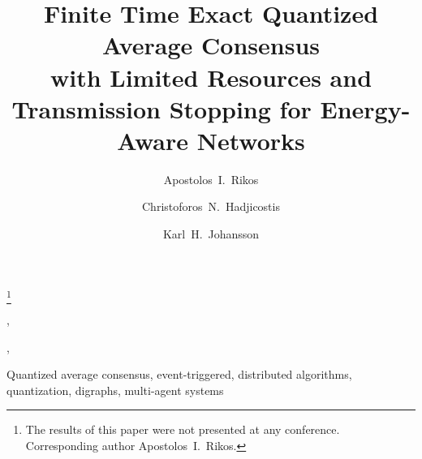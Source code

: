 \documentclass[twocolumn]{autart}    %
\begin{document}
\begin{frontmatter}

\title{Finite Time Exact Quantized Average Consensus \\ with Limited Resources and Transmission Stopping for Energy-Aware Networks} %
 
\thanks[footnoteinfo]{The results of this paper were not presented at any conference.
Corresponding author Apostolos~I.~Rikos.}

\author[First]{Apostolos~I.~Rikos}, 
\author[Second]{Christoforos~N.~Hadjicostis}, 
\author[First]{Karl~H.~Johansson} 

\address[First]{Division of Decision and Control Systems, KTH Royal Institute of Technology, \\ and also affiliated with Digital Futures, SE-100 44 Stockholm, Sweden}  %
\address[Second]{Department of Electrical and Computer Engineering, University of Cyprus, Nicosia, Cyprus}             %

\begin{keyword}                          
Quantized average consensus, event-triggered, distributed algorithms, quantization, digraphs, multi-agent systems             
\end{keyword}                             


\end{frontmatter}
\end{document}
